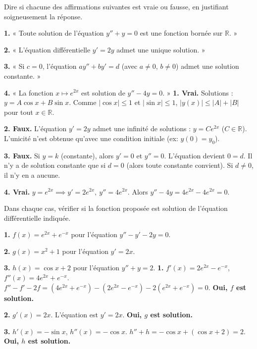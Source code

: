 \documentclass[11pt]{article}
\begin{document}
\begin{exoresolu}
Dire si chacune des affirmations suivantes est vraie ou fausse, en justifiant soigneusement la réponse.

\textbf{1.} « Toute solution de l'équation $y'' + y = 0$ est une fonction bornée sur $\mathbb{R}$. »

\textbf{2.} « L'équation différentielle $y' = 2y$ admet une unique solution. »

\textbf{3.} « Si $c = 0$, l'équation $ay'' + by' = d$ (avec $a \neq 0$, $b \neq 0$) admet une solution constante. »

\textbf{4.} « La fonction $x \mapsto e^{2x}$ est solution de $y'' - 4y = 0$. »
\tcblower
\textbf{1. Vrai.} Solutions : $y = A\cos x + B\sin x$. Comme $|\cos x| \le 1$ et $|\sin x| \le 1$, $|y(x)| \le |A| + |B|$ pour tout $x \in \mathbb{R}$.

\textbf{2. Faux.} L'équation $y' = 2y$ admet une infinité de solutions : $y = Ce^{2x}$ ($C \in \mathbb{R}$). L'unicité n'est obtenue qu'avec une condition initiale (ex: $y(0)=y_0$).

\textbf{3. Faux.} Si $y = k$ (constante), alors $y' = 0$ et $y'' = 0$. L'équation devient $0 = d$. Il n'y a de solution constante que si $d = 0$ (alors toute constante convient). Si $d \neq 0$, il n'y en a aucune.

\textbf{4. Vrai.} $y = e^{2x} \implies y' = 2e^{2x},\ y'' = 4e^{2x}$. Alors $y'' - 4y = 4e^{2x} - 4e^{2x} = 0$.
\end{exoresolu}

\begin{exoresolu}
Dans chaque cas, vérifier si la fonction proposée est solution de l'équation différentielle indiquée.

\textbf{1.} $f(x) = e^{2x} + e^{-x}$ pour l'équation $y'' - y' - 2y = 0$.

\textbf{2.} $g(x) = x^2 + 1$ pour l'équation $y' = 2x$.

\textbf{3.} $h(x) = \cos x + 2$ pour l'équation $y'' + y = 2$.
\tcblower
\textbf{1.} $f'(x) = 2e^{2x} - e^{-x}$, $f''(x) = 4e^{2x} + e^{-x}$.
$f'' - f' - 2f = (4e^{2x}+e^{-x}) - (2e^{2x}-e^{-x}) - 2(e^{2x}+e^{-x}) = 0$. \textbf{Oui, $f$ est solution.}

\textbf{2.} $g'(x) = 2x$. L'équation est $y' = 2x$. \textbf{Oui, $g$ est solution.}

\textbf{3.} $h'(x) = -\sin x$, $h''(x) = -\cos x$.
$h'' + h = -\cos x + (\cos x + 2) = 2$. \textbf{Oui, $h$ est solution.}
\end{exoresolu}
\end{document}
